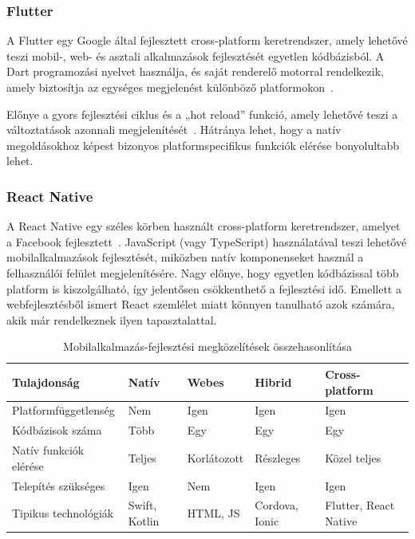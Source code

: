 \documentclass[
]{thesis-ekf}
\theoremstyle{definition}
\theoremstyle{remark}
\begin{document}
\subsubsection{Flutter} A Flutter egy Google által fejlesztett cross-platform keretrendszer, amely lehetővé teszi mobil-, web- és asztali alkalmazások fejlesztését egyetlen kódbázisból. A Dart programozási nyelvet használja, és saját renderelő motorral rendelkezik, amely biztosítja az egységes megjelenést különböző platformokon~\cite{flutter}.

Előnye a gyors fejlesztési ciklus és a „hot reload” funkció, amely lehetővé teszi a változtatások azonnali megjelenítését~\cite{flutter_hotreload}. Hátránya lehet, hogy a natív megoldásokhoz képest bizonyos platformspecifikus funkciók elérése bonyolultabb lehet.

\subsubsection{React Native} A React Native egy széles körben használt cross-platform keretrendszer, amelyet a Facebook fejlesztett~\cite{react_native_book}. JavaScript (vagy TypeScript) használatával teszi lehetővé mobilalkalmazások fejlesztését, miközben natív komponenseket használ a felhasználói felület megjelenítésére. Nagy előnye, hogy egyetlen kódbázissal több platform is kiszolgálható, így jelentősen csökkenthető a fejlesztési idő. Emellett a webfejlesztésből ismert React szemlélet miatt könnyen tanulható azok számára, akik már rendelkeznek ilyen tapasztalattal.

\begin{table}[h]
\centering
\caption{Mobilalkalmazás-fejlesztési megközelítések összehasonlítása}
\label{tab_mobil_dev_comp}
\begin{tabularx}{\textwidth}{|l|X|X|X|X|}
\hline
\textbf{Tulajdonság} & \textbf{Natív} & \textbf{Webes} & \textbf{Hibrid} & \textbf{Cross-platform} \\
\hline
Platformfüggetlenség & Nem & Igen & Igen & Igen \\
\hline
Kódbázisok száma & Több & Egy & Egy & Egy \\
\hline
Natív funkciók elérése & Teljes & Korlátozott & Részleges & Közel teljes \\
\hline
Telepítés szükséges & Igen & Nem & Igen & Igen \\
\hline
Tipikus technológiák & Swift, Kotlin & HTML, JS & Cordova, Ionic & Flutter, React Native \\
\hline
\end{tabularx}
\end{table}
\end{document}
